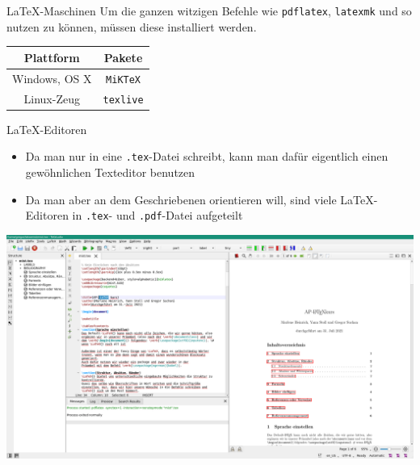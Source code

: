 \documentclass[compress, 10pt, aspectratio=169]{beamer}
\begin{document}
\begin{frame}{\LaTeX{}-Maschinen}
  Um die ganzen witzigen Befehle wie \texttt{pdflatex}, \texttt{latexmk} und so
  nutzen zu können, müssen diese installiert werden.
  \begin{center}
    \begin{tabular}{cc}
      \toprule
      Plattform & Pakete \\
      \midrule
      Windows, OS X & \texttt{MiKTeX} \\
      Linux-Zeug & \texttt{texlive} \\
      \bottomrule
    \end{tabular}
  \end{center}
\end{frame}

\begin{frame}{\LaTeX{}-Editoren}
  \begin{itemize}
    \item
      Da man nur in eine \texttt{.tex}-Datei schreibt, kann man dafür
      eigentlich einen gewöhnlichen Texteditor benutzen
    \item
      Da man aber an dem Geschriebenen orientieren will, sind viele
      \LaTeX-Editoren in \texttt{.tex}- und \texttt{.pdf}-Datei aufgeteilt
  \end{itemize}

\end{frame}

\begin{frame}
  \begin{center}
    \includegraphics[width=.9\textwidth]{./texstudio.png}
  \end{center}
\end{frame}
\end{document}
